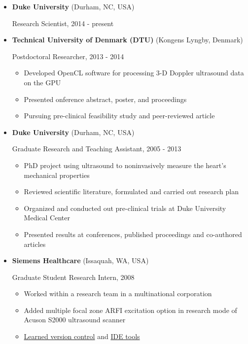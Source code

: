 \documentclass[]{article}
\begin{document}
\begin{itemize}
\item
  \textbf{Duke University} (Durham, NC, USA)

  Research Scientist, 2014 - present
\item
  \textbf{Technical University of Denmark (DTU)} (Kongens Lyngby,
  Denmark)

  Postdoctoral Researcher, 2013 - 2014

  \begin{itemize}
  \itemsep1pt\parskip0pt
  \item
    Developed OpenCL software for processing 3-D Doppler ultrasound data
    on the GPU
  \item
    Presented onference abstract, poster, and proceedings
  \item
    Pursuing pre-clinical feasibility study and peer-reviewed article
  \end{itemize}
\item
  \textbf{Duke University} (Durham, NC, USA)

  Graduate Research and Teaching Assistant, 2005 - 2013

  \begin{itemize}
  \itemsep1pt\parskip0pt
  \item
    PhD project using ultrasound to noninvasively measure the heart's
    mechanical properties
  \item
    Reviewed scientific literature, formulated and carried out research
    plan
  \item
    Organized and conducted out pre-clinical trials at Duke University
    Medical Center
  \item
    Presented results at conferences, published proceedings and
    co-authored articles
  \end{itemize}
\item
  \textbf{Siemens Healthcare} (Issaquah, WA, USA)

  Graduate Student Research Intern, 2008

  \begin{itemize}
  \itemsep1pt\parskip0pt
  \item
    Worked within a research team in a multinational corporation
  \item
    Added multiple focal zone ARFI excitation option in research mode of
    Acuson S2000 ultrasound scanner
  \item
    \href{http://www-03.ibm.com/software/products/en/clearcase}{Learned
    version control} and \href{http://www.visualstudio.com/}{IDE tools}
  \end{itemize}
\end{itemize}
\end{document}

